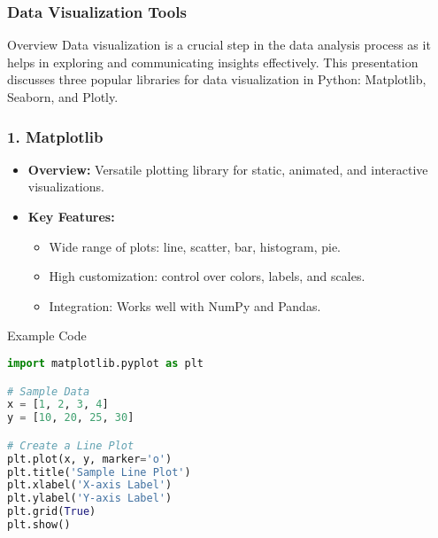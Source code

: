 \documentclass[aspectratio=169]{beamer}
\begin{document}
\begin{frame}
    \frametitle{Data Visualization Tools}
    \begin{block}{Overview}
        Data visualization is a crucial step in the data analysis process as it helps in exploring and communicating insights effectively. This presentation discusses three popular libraries for data visualization in Python: Matplotlib, Seaborn, and Plotly.
    \end{block}
\end{frame}

\begin{frame}
    \frametitle{1. Matplotlib}
    \begin{itemize}
        \item \textbf{Overview:} Versatile plotting library for static, animated, and interactive visualizations.
        \item \textbf{Key Features:}
            \begin{itemize}
                \item Wide range of plots: line, scatter, bar, histogram, pie.
                \item High customization: control over colors, labels, and scales.
                \item Integration: Works well with NumPy and Pandas.
            \end{itemize}
    \end{itemize}
    \begin{block}{Example Code}
    \begin{lstlisting}[language=Python]
import matplotlib.pyplot as plt

# Sample Data
x = [1, 2, 3, 4]
y = [10, 20, 25, 30]

# Create a Line Plot
plt.plot(x, y, marker='o')
plt.title('Sample Line Plot')
plt.xlabel('X-axis Label')
plt.ylabel('Y-axis Label')
plt.grid(True)
plt.show()
    \end{lstlisting}
    \end{block}
\end{frame}
\end{document}
